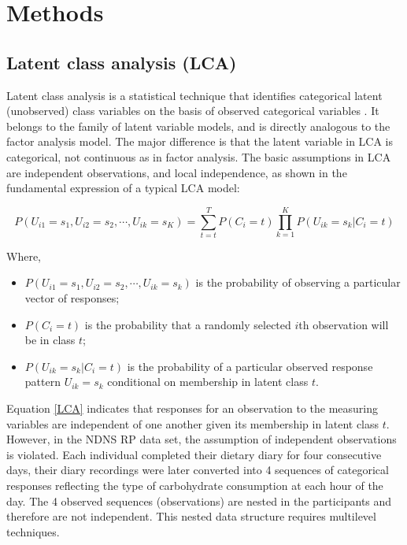 
\chapter{Methods} %

\label{Chapter 2} %


\section{Latent class analysis (LCA)}\vspace{-0.3cm}

Latent class analysis is a statistical technique that identifies categorical latent (unobserved) class variables on the basis of observed categorical variables \parencite{collins2010latent}. It belongs to the family of latent variable models, and is directly analogous to the factor analysis model. The major difference is that the latent variable in LCA is categorical, not continuous as in factor analysis. The basic assumptions in LCA are independent observations, and local independence, as shown in the fundamental expression of a typical LCA model: \vspace{-0.8cm}

\begin{equation}
P(U_{i1} = s_1, U_{i2} = s_2, \cdots, U_{ik} = s_K) = \sum_{t=t}^{T}P(C_i = t)\prod_{k = 1}^{K}P(U_{ik} = s_k | C_i = t)
\label{LCA}
\end{equation}\vspace{-0.7cm}

Where, 

\begin{itemize}
	\item $P(U_{i1} = s_1, U_{i2} = s_2, \cdots, U_{ik} = s_k)$ is the probability of observing a particular vector of responses;
	\item $P(C_i = t)$ is the probability that a randomly selected $i$th observation will be in class $t$;
	\item $P(U_{ik} = s_k | C_i = t)$ is the probability of a particular observed response pattern $U_{ik} = s_k$ conditional on membership in latent class $t$.
\end{itemize}


Equation \ref{LCA} indicates that responses for an observation to the measuring variables are independent of one another given its membership in latent class $t$. However, in the NDNS RP data set, the assumption of independent observations is violated. Each individual completed their dietary diary for four consecutive days, their diary recordings were later converted into 4 sequences of categorical responses reflecting the type of carbohydrate consumption at each hour of the day. The 4 observed sequences (observations) are nested in the participants and therefore are not independent. This nested data structure requires multilevel techniques. 
\vspace{-0.3cm}

